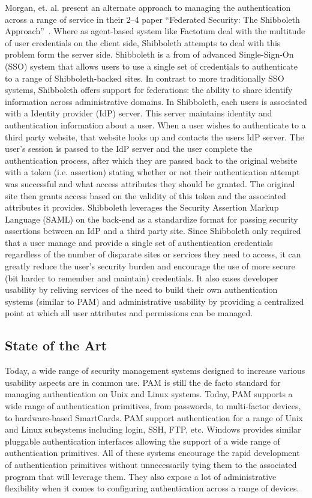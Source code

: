 \documentclass{sig-alternate}
\begin{document}
Morgan, et. al. present an alternate approach to managing the
authentication across a range of service in their 2--4 paper
``Federated Security: The Shibboleth
Approach''~\cite{Morgan2004}. Where as agent-based system like
Factotum deal with the multitude of user credentials on the client
side, Shibboleth attempts to deal with this problem form the server
side. Shibboleth is a from of advanced Single-Sign-On (SSO) system
that allows users to use a single set of credentials to authenticate
to a range of Shibboleth-backed sites. In contrast to more
traditionally SSO systems, Shibboleth offers support for federations:
the ability to share identify information across administrative
domains. In Shibboleth, each users is associated with a Identity
provider (IdP) server. This server maintains identity and
authentication information about a user. When a user wishes to
authenticate to a third party website, that website looks up and
contacts the users IdP server. The user's session is passed to the IdP
server and the user complete the authentication process, after which
they are passed back to the original website with a token
(i.e. assertion) stating whether or not their authentication attempt
was successful and what access attributes they should be granted. The
original site then grants access based on the validity of this token
and the associated attributes it provides. Shibboleth leverages the
Security Assertion Markup Language (SAML) on the back-end as a
standardize format for passing security assertions between an IdP and
a third party site. Since Shibboleth only required that a user manage
and provide a single set of authentication credentials regardless of
the number of disparate sites or services they need to access, it can
greatly reduce the user's security burden and encourage the use of
more secure (bit harder to remember and maintain) credentials. It also
eases developer usability by reliving services of the need to build
their own authentication systems (similar to PAM) and administrative
usability by providing a centralized point at which all user
attributes and permissions can be managed.

\subsection{State of the Art}

Today, a wide range of security management systems designed to
increase various usability aspects are in common use. PAM is still the
de facto standard for managing authentication on Unix and Linux
systems. Today, PAM supports a wide range of authentication
primitives, from passwords, to multi-factor devices, to hardware-based
SmartCards. PAM support authentication for a range of Unix and Linux
subsystems including login, SSH, FTP, etc. Windows provides similar
pluggable authentication interfaces allowing the support of a wide
range of authentication primitives. All of these systems encourage the
rapid development of authentication primitives without unnecessarily
tying them to the associated program that will leverage them. They
also expose a lot of administrative flexibility when it comes to
configuring authentication across a range of devices.
\end{document}
